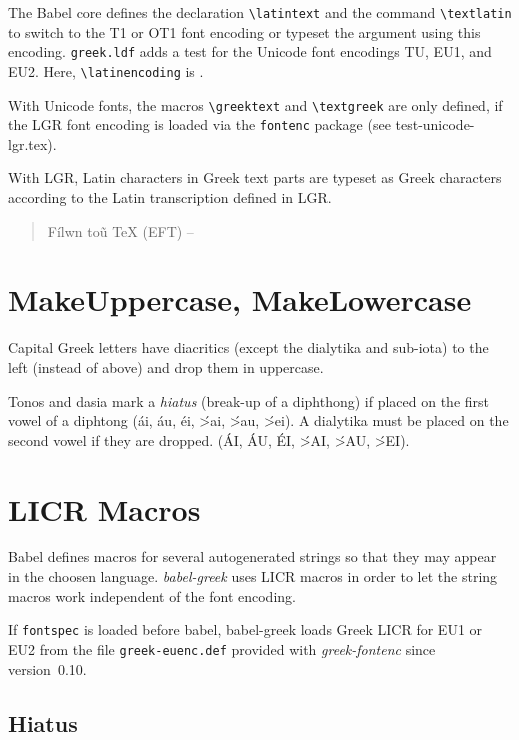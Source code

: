 \documentclass[a4paper]{article}
\begin{document}
The Babel core defines the declaration \verb|\latintext| and the command
\verb|\textlatin| to switch to the T1 or OT1 font encoding or typeset the
argument using this encoding. \texttt{greek.ldf} adds a test for the Unicode
font encodings TU, EU1, and EU2. Here, \verb|\latinencoding| is
\latinencoding.

With Unicode fonts, the macros \verb|\greektext| and \verb|\textgreek| are
only defined, if the LGR font encoding is loaded via the \texttt{fontenc}
package (see test-unicode-lgr.tex).

With LGR, Latin characters in Greek text parts are typeset as Greek characters
according to the Latin transcription defined in LGR.%

\begin{quote}
  \greektext F\'ilwn to\~u \textlatin{TeX} (EFT) --
\end{quote}

\section{MakeUppercase, MakeLowercase}

Capital Greek letters have diacritics (except the dialytika and sub-iota) to
the left (instead of above) and drop them in uppercase.

Tonos and dasia mark a \emph{hiatus} (break-up of a diphthong) if placed on
the first vowel of a diphtong (\textgreek{\'ai, \'au, \'ei, \'>ai, \'>au,
\'>ei}). A dialytika must be placed on the second vowel if they are dropped.
(\foreignlanguage{greek}{\MakeUppercase{\'ai, \'au, \'ei, \'>ai, \'>au,
\'>ei}}).

\section{LICR Macros}

Babel defines macros for several autogenerated strings so that they may
appear in the choosen language. \emph{babel-greek} uses LICR macros in
order to let the string macros work independent of the font encoding.

If \texttt{fontspec} is loaded before babel, babel-greek loads Greek LICR
for EU1 or EU2 from the file \texttt{greek-euenc.def}
provided with \emph{greek-fontenc} since version~0.10.

\subsection{Hiatus}
\end{document}
